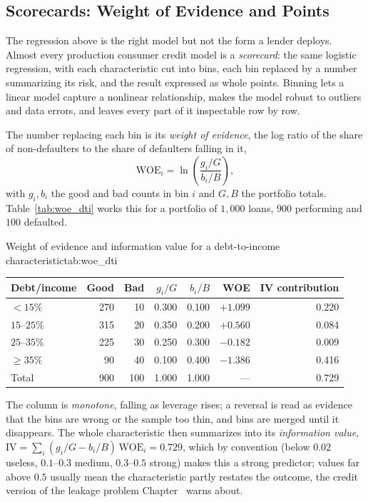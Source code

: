 \documentclass[../ai_in_finance]{subfiles}
\begin{document}
\subsection{Scorecards: Weight of Evidence and Points}
\label{sec:scorecard}

The regression above is the right model but not the form a lender deploys. Almost every production consumer credit model is a \emph{scorecard}: the same logistic regression, with each characteristic cut into bins, each bin replaced by a number summarizing its risk, and the result expressed as whole points. Binning lets a linear model capture a nonlinear relationship, makes the model robust to outliers and data errors, and leaves every part of it inspectable row by row.

The number replacing each bin is its \emph{weight of evidence}, the log ratio of the share of non-defaulters to the share of defaulters falling in it,
\begin{equation}
\label{eq:creditrisk-woe}
\text{WOE}_i = \ln\!\left(\frac{g_i/G}{b_i/B}\right),
\end{equation}
with $g_i, b_i$ the good and bad counts in bin $i$ and $G, B$ the portfolio totals. Table~\ref{tab:woe_dti} works this for a portfolio of $1{,}000$ loans, $900$ performing and $100$ defaulted.

\begin{booktable}[htbp]{Weight of evidence and information value for a debt-to-income characteristic}{tab:woe_dti}
\begin{tabular}{lrrrrrr}
\toprule
Debt/income & Good & Bad & $g_i/G$ & $b_i/B$ & WOE & IV contribution \\
\midrule
$<15\%$        & 270 & 10 & 0.300 & 0.100 & $+1.099$ & 0.220 \\
$15$--$25\%$   & 315 & 20 & 0.350 & 0.200 & $+0.560$ & 0.084 \\
$25$--$35\%$   & 225 & 30 & 0.250 & 0.300 & $-0.182$ & 0.009 \\
$\ge 35\%$     &  90 & 40 & 0.100 & 0.400 & $-1.386$ & 0.416 \\
\midrule
Total          & 900 & 100 & 1.000 & 1.000 & --- & 0.729 \\
\bottomrule
\end{tabular}
\end{booktable}

The column is \emph{monotone}, falling as leverage rises; a reversal is read as evidence that the bins are wrong or the sample too thin, and bins are merged until it disappears. The whole characteristic then summarizes into its \emph{information value}, $\text{IV} = \sum_i (g_i/G - b_i/B)\,\text{WOE}_i = 0.729$, which by convention (below $0.02$ useless, $0.1$--$0.3$ medium, $0.3$--$0.5$ strong) makes this a strong predictor; values far above $0.5$ usually mean the characteristic partly restates the outcome, the credit version of the leakage problem Chapter~ warns about.
\end{document}

